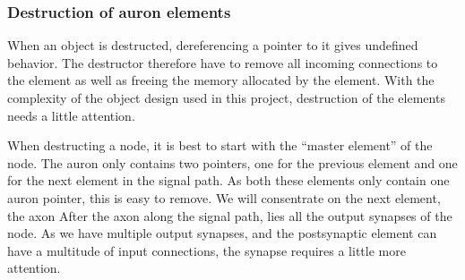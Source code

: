 %
%			



	\subsubsection{Destruction of auron elements}
	When an object is destructed, dereferencing a pointer to it gives undefined behavior.  %
	The destructor therefore have to remove all incoming connections to the element as well as freeing the memory allocated by the element.
	With the complexity of the object design used in this project, destruction of the elements needs a little attention.


	When destructing a node, it is best to start with the ``master element'' of the node.
	The auron only contains two pointers, one for the previous element and one for the next element in the signal path.
	As both these elements only contain one auron pointer, this is easy to remove.
	We will consentrate on the next element, the axon
	After the axon along the signal path, lies all the output synapses of the node.
	As we have multiple output synapses, and the postsynaptic element can have a multitude of input connections, the synapse requires a little more attention.

